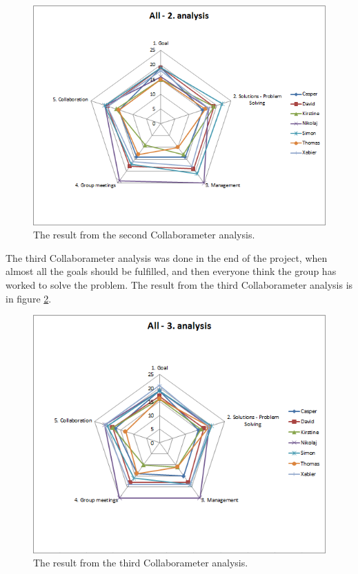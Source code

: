 \begin{figure}
\centering
\includegraphics[width=0.7\linewidth]{./graphics/2analysisCollaborameter}
\caption{The result from the second Collaborameter analysis.}
\label{fig:2analysisCollaborameter}
\end{figure}

The third Collaborameter analysis was done in the end of the project, when almost all the goals should be fulfilled, and then everyone think the group has worked to solve the problem. The result from the third Collaborameter analysis is in figure \ref{fig:3analysisCollaborameter}.

\begin{figure}
\centering
\includegraphics[width=0.7\linewidth]{./graphics/3analysisCollaborameter}
\caption{The result from the third Collaborameter analysis.}
\label{fig:3analysisCollaborameter}
\end{figure}


